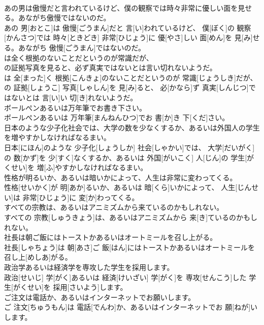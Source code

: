 \documentclass[8pt]{extreport}
\begin{document}
\begin{CJK}{UTF8}{min}
\\	あの男は傲慢だと言われているけど、僕の観察では時々非常に優しい面を見せる。あながち傲慢ではないのだ。	
\\	あの 男[おとこ]は 傲慢[ごうまん]だと 言[い]われているけど、 僕[ぼく]の 観察[かんさつ]では 時々[ときどき] 非常[ひじょう]に 優[やさ]しい 面[めん]を 見[み]せる。あながち 傲慢[ごうまん]ではないのだ。
\\	は全く根拠のないことだというのが常識だが、
\\	の証拠写真を見ると、必ず真実ではないとは言い切れないようだ。	
\\	[ユーフォー]は 全[まった]く 根拠[こんきょ]のないことだというのが 常識[じょうしき]だが、 
\\	[ユーフォー]の 証拠[しょうこ] 写真[しゃしん]を 見[み]ると、 必[かなら]ず 真実[しんじつ]ではないとは 言[い]い 切[き]れないようだ。
\\	ボールぺンあるいは万年筆でお書き下さい。	
\\	ボールぺンあるいは 万年筆[まんねんひつ]でお 書[か]き 下[くだ]さい。
\\	日本のような少子化社会では、大学の数を少なくするか、あるいは外国人の学生を増やすかしなければなるまい。	
\\	日本[にほん]のような 少子化[しょうしか] 社会[しゃかい]では、 大学[だいがく]の 数[かず]を 少[すく]なくするか、あるいは 外国[がいこく] 人[じん]の 学生[がくせい]を 増[ふ]やすかしなければなるまい。
\\	性格が明るいか、あるいは暗いかによって、人生は非常に変わってくる。	
\\	性格[せいかく]が 明[あか]るいか、あるいは 暗[くら]いかによって、 人生[じんせい]は 非常[ひじょう]に 変[か]わってくる。
\\	すべての宗教は、あるいはアニミズムから来ているのかもしれない。	
\\	すべての 宗教[しゅうきょう]は、あるいはアニミズムから 来[き]ているのかもしれない。
\\	社長は朝ご飯にはトーストかあるいはオートミールを召し上がる。	
\\	社長[しゃちょう]は 朝[あさ]ご 飯[はん]にはトーストかあるいはオートミールを 召し上[めしあ]がる。
\\	政治学あるいは経済学を専攻した学生を採用します。	
\\	政治[せいじ] 学[がく]あるいは 経済[けいざい] 学[がく]を 専攻[せんこう]した 学生[がくせい]を 採用[さいよう]します。
\\	ご注文は電話か、あるいはインターネットでお願いします。	
\\	ご 注文[ちゅうもん]は 電話[でんわ]か、あるいはインターネットでお 願[ねが]いします。

\end{CJK}
\end{document}
